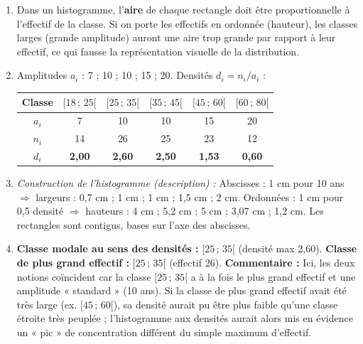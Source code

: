 \documentclass[11pt]{article}
\begin{document}
\begin{corrige}
\begin{enumerate}
\item Dans un histogramme, l'\textbf{aire} de chaque rectangle doit être proportionnelle à l'effectif de la classe. Si on porte les effectifs en ordonnée (hauteur), les classes larges (grande amplitude) auront une aire trop grande par rapport à leur effectif, ce qui fausse la représentation visuelle de la distribution.
\item Amplitudes $a_i$ : 7 ; 10 ; 10 ; 15 ; 20.
Densités $d_i = n_i/a_i$ :
\begin{center}
\begin{tabular}{|c|ccccc|}\hline
Classe & $[18\,;\,25[$ & $[25\,;\,35[$ & $[35\,;\,45[$ & $[45\,;\,60[$ & $[60\,;\,80[$ \\ \hline
$a_i$ & 7 & 10 & 10 & 15 & 20 \\
$n_i$ & 14 & 26 & 25 & 23 & 12 \\
$d_i$ & \textbf{2,00} & \textbf{2,60} & \textbf{2,50} & \textbf{1,53} & \textbf{0,60} \\ \hline
\end{tabular}
\end{center}
\item \textit{Construction de l'histogramme (description) :}
Abscisses : 1 cm pour 10 ans $\Rightarrow$ largeurs : 0,7 cm ; 1 cm ; 1 cm ; 1,5 cm ; 2 cm.
Ordonnées : 1 cm pour 0,5 densité $\Rightarrow$ hauteurs : 4 cm ; 5,2 cm ; 5 cm ; 3,07 cm ; 1,2 cm.
Les rectangles sont contigus, bases sur l'axe des abscisses.
\item \textbf{Classe modale au sens des densités :} $[25\,;\,35[$ (densité max 2,60).
\textbf{Classe de plus grand effectif :} $[25\,;\,35[$ (effectif 26).
\textbf{Commentaire :} Ici, les deux notions coïncident car la classe $[25\,;\,35[$ a à la fois le plus grand effectif et une amplitude « standard » (10 ans). Si la classe de plus grand effectif avait été très large (ex. $[45\,;\,60[$), sa densité aurait pu être plus faible qu'une classe étroite très peuplée ; l'histogramme aux densités aurait alors mis en évidence un « pic » de concentration différent du simple maximum d'effectif.
\end{enumerate}
\end{corrige}
\end{document}
